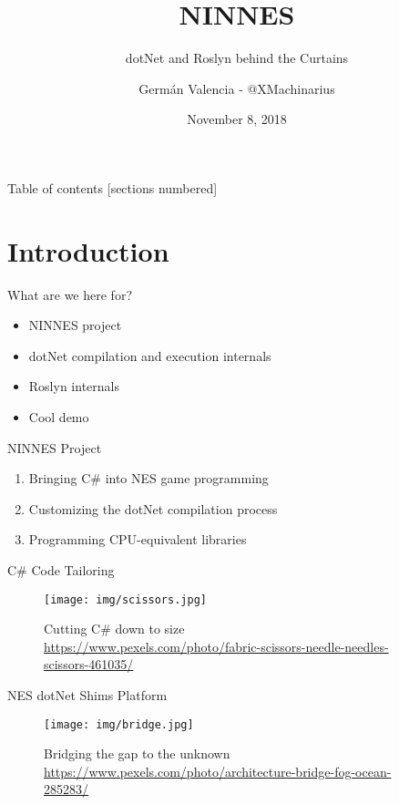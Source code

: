 \documentclass[10pt]{beamer}
\title{NINNES}
\subtitle{dotNet and Roslyn behind the Curtains}
\date{November 8, 2018}
\author{Germán Valencia - @XMachinarius}
\institute{Growth Acceleration Partners}
\begin{document}
\maketitle

\begin{frame}{Table of contents}
  [sections numbered]
  \tableofcontents[hideallsubsections]
\end{frame}

\section{Introduction}
\begin{frame}{What are we here for?}
    \begin{itemize}
        \item NINNES project
        \item dotNet compilation and execution internals
        \item Roslyn internals
        \item Cool demo
    \end{itemize}
\end{frame}

\begin{frame}{NINNES Project}
    \begin{enumerate}
        \item Bringing C\# into NES game programming
        \item Customizing the dotNet compilation process
        \item Programming CPU-equivalent libraries
    \end{enumerate}
\end{frame}

\begin{frame}{C\# Code Tailoring}
    \begin{figure}
        \centering
        \texttt{[image: img/scissors.jpg]}
        \caption{Cutting C\# down to size \\ \tiny{\href{Photo by Pixabay, taken from Pexels}{https://www.pexels.com/photo/fabric-scissors-needle-needles-scissors-461035/}}}
    \end{figure}
\end{frame}

\begin{frame}{NES dotNet Shims Platform}
    \begin{figure}
        \centering
        \texttt{[image: img/bridge.jpg]}
        \caption{Bridging the gap to the unknown \\ \tiny{\href{Photo by Nikolai Ulltang from Pexels}{https://www.pexels.com/photo/architecture-bridge-fog-ocean-285283/}}}
    \end{figure}
\end{frame}
\end{document}
